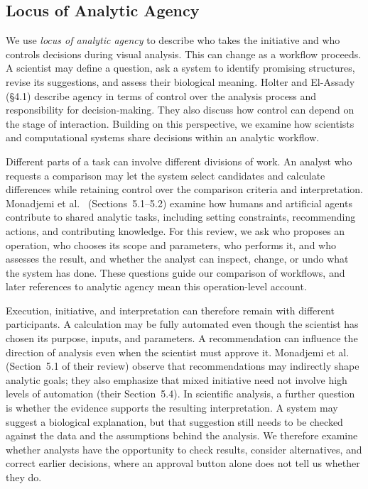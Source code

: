 \subsection{Locus of Analytic Agency}
\label{subsection:locusofagency}

We use \emph{locus of analytic agency} to describe who takes the initiative and who controls decisions during visual analysis. This can change as a workflow proceeds. A scientist may define a question, ask a system to identify promising structures, revise its suggestions, and assess their biological meaning. Holter and El-Assady~\cite{HolterElAssady2024Agency} (§4.1) describe agency in terms of control over the analysis process and responsibility for decision-making. They also discuss how control can depend on the stage of interaction. Building on this perspective, we examine how scientists and computational systems share decisions within an analytic workflow.

Different parts of a task can involve different divisions of work. An analyst who requests a comparison may let the system select candidates and calculate differences while retaining control over the comparison criteria and interpretation. Monadjemi et al.~\cite{Monadjemi2026MixedInitiative} (Sections~5.1--5.2) examine how humans and artificial agents contribute to shared analytic tasks, including setting constraints, recommending actions, and contributing knowledge. For this review, we ask who proposes an operation, who chooses its scope and parameters, who performs it, and who assesses the result, and whether the analyst can inspect, change, or undo what the system has done. These questions guide our comparison of workflows, and later references to analytic agency mean this operation-level account.

Execution, initiative, and interpretation can therefore remain with different participants. A calculation may be fully automated even though the scientist has chosen its purpose, inputs, and parameters. A recommendation can influence the direction of analysis even when the scientist must approve it. Monadjemi et al.~\cite{Monadjemi2026MixedInitiative} (Section~5.1 of their review) observe that recommendations may indirectly shape analytic goals; they also emphasize that mixed initiative need not involve high levels of automation (their Section~5.4). In scientific analysis, a further question is whether the evidence supports the resulting interpretation. A system may suggest a biological explanation, but that suggestion still needs to be checked against the data and the assumptions behind the analysis. We therefore examine whether analysts have the opportunity to check results, consider alternatives, and correct earlier decisions, where an approval button alone does not tell us whether they do.

